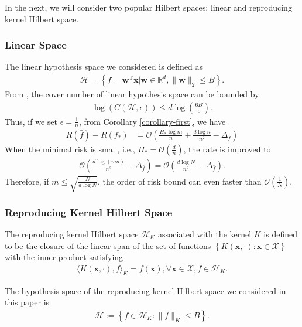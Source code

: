 \documentclass{article}
\begin{document}
In the next, we will consider two popular Hilbert spaces:
linear and reproducing kernel Hilbert space.
\subsubsection{Linear Space}
\label{subsection-3.1}
The linear hypothesis space we considered is defined as
\begin{align*}
\mathcal{H}=\left\{f=\mathbf w^\mathrm T\mathbf x\Big|\mathbf w\in \mathbb{R}^d, \|\mathbf w\|_2\leq B\right\}.
\end{align*}
From \cite{pisier1999volume},
the cover number of linear hypothesis space can be bounded by
\begin{align*}
  \log\left(C(\mathcal{H},\epsilon)\right)\leq d\log \left(\frac{6B}{\epsilon}\right).
\end{align*}
Thus, if we set $\epsilon=\frac{1}{n}$, from Corollary \ref{corollary-first}, we have
\begin{align*}
  R(\bar{f})-R(f_\ast)&=\mathcal{O}\left(\frac{H_\ast\log m}{n}+\frac{d\log n}{n^2}-
  \Delta_{\bar{f}}\right)
\end{align*}
When the minimal risk is small, i.e., $H_\ast=\mathcal{O}\left(\frac{d}{n}\right)$,
the rate is improved to
\begin{align*}
    \mathcal{O}\left(\frac{d\log (mn)}{n^2}-\Delta_{\bar{f}}\right)=\mathcal{O}\left(\frac{d\log N}{n^2}-\Delta_{\bar{f}}\right).
\end{align*}
Therefore, if $m\leq \sqrt{\frac{N}{d\log N}}$, the order of risk bound can even faster than
$\mathcal{O}\left(\frac{1}{N}\right).$
\subsubsection{Reproducing Kernel Hilbert Space}
\label{subsection-3.2}
The reproducing kernel Hilbert space $\mathcal{H}_K$ associated with the kernel $K$ is
defined to be the closure of the linear span of the set of functions
$\left\{K(\mathbf x,\cdot):\mathbf x\in\mathcal{X}\right\}$ with the inner product satisfying
\begin{align*}
  \langle K(\mathbf x,\cdot), f\rangle_{K}=f(\mathbf x), \forall \mathbf x\in\mathcal{X}, f\in\mathcal{H}_K.
\end{align*}

The  hypothesis space of the reproducing kernel Hilbert space we considered in this paper is
\begin{align*}
  \mathcal{H}:=\left\{f\in\mathcal{H}_{K}: \|f\|_{K}\leq B\right\}.
\end{align*}
\end{document}

